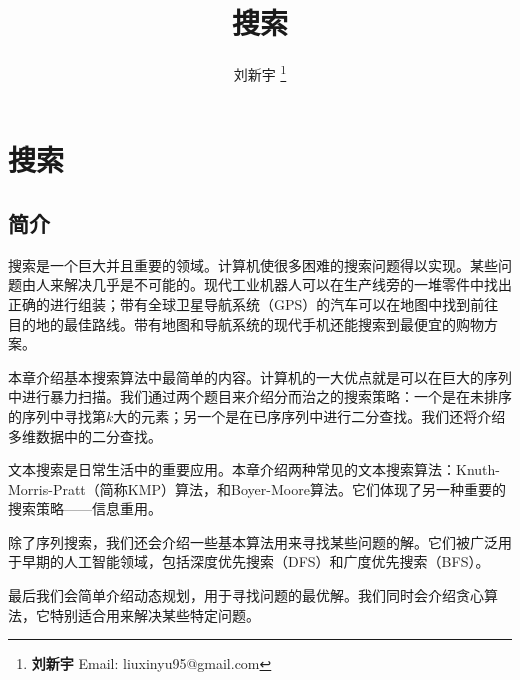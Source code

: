 \documentclass[UTF8]{article}
\begin{document}


\title{搜索}

\author{刘新宇
\thanks{{\bfseries 刘新宇 } \newline
  Email: liuxinyu95@gmail.com \newline}
  }

\maketitle
\fi


\ifx\wholebook\relax
\chapter{搜索}
\fi

\def\includetikz{}

\section{简介}
\label{introduction}

搜索是一个巨大并且重要的领域。计算机使很多困难的搜索问题得以实现。某些问题由人来解决几乎是不可能的。现代工业机器人可以在生产线旁的一堆零件中找出正确的进行组装；带有全球卫星导航系统（GPS）的汽车可以在地图中找到前往目的地的最佳路线。带有地图和导航系统的现代手机还能搜索到最便宜的购物方案。

本章介绍基本搜索算法中最简单的内容。计算机的一大优点就是可以在巨大的序列中进行暴力扫描。我们通过两个题目来介绍分而治之的搜索策略：一个是在未排序的序列中寻找第$k$大的元素；另一个是在已序序列中进行二分查找。我们还将介绍多维数据中的二分查找。

文本搜索是日常生活中的重要应用。本章介绍两种常见的文本搜索算法：Knuth-Morris-Pratt（简称KMP）算法，和Boyer-Moore算法。它们体现了另一种重要的搜索策略——信息重用。

除了序列搜索，我们还会介绍一些基本算法用来寻找某些问题的解。它们被广泛用于早期的人工智能领域，包括深度优先搜索（DFS）和广度优先搜索（BFS）。

最后我们会简单介绍动态规划，用于寻找问题的最优解。我们同时会介绍贪心算法，它特别适合用来解决某些特定问题。
\end{document}
